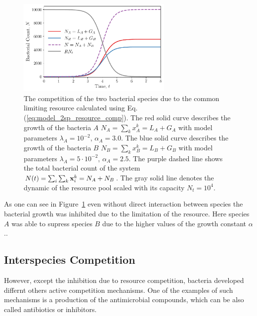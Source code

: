 \documentclass[10pt,A4paper]{article}
\begin{document}
\begin{figure}[H]
    \begin{center}
    \includegraphics[width=0.67\textwidth]{Figures/pool_model_2pools_resource_competition.pdf}
    \caption{{\footnotesize The competition of the two bacterial species due to the common limiting resource calculated using Eq. (\ref{eq:model_2sp_resource_comp}).
    The red solid curve describes the growth of the bacteria $A$ $N_A = \sum_{k} x_A^k = L_A+G_A$ with model parameters $\lambda_A=10^{-2}$, $\alpha_A=3.0$.
    The blue solid curve describes the growth of the bacteria $B$ $N_B = \sum_{k} x_B^k = L_B+G_B$ with model parameters $\lambda_A=5\cdot 10^{-2}$, $\alpha_A=2.5$.
    The purple dashed line shows the total bacterial count of the system  $N(t)=\sum_i\sum_k\mathbf{x}_i^k=N_A+N_B$.
    The gray solid line denotes the dynamic of the resource pool scaled with its capacity $N_t=10^4$.}}
    \label{fig:2pool_resource_2sp}
    \end{center}
\end{figure}
As one can see in Figure~\ref{fig:2pool_resource_2sp} even without direct interaction between species the bacterial growth was inhibited due to the limitation of the resource.
Here species $A$ was able to supress species $B$ due to the higher values of the growth constant $\alpha$..


\subsection{Interspecies Competition}

However, except the inhibition due to resource competition, bacteria developed differnt others active competition mechanisms.
One of the examples of such mechanisms is a production of the antimicrobial compounds, which can be also called antibiotics or inhibitors. 
\end{document}
